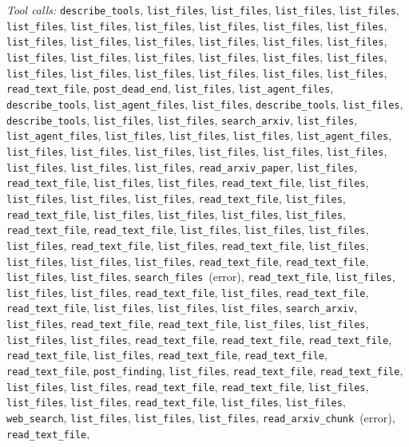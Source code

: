 \documentclass[11pt,a4paper]{article}
\begin{document}
\textit{Tool calls:} \texttt{describe\_tools}, \texttt{list\_files}, \texttt{list\_files}, \texttt{list\_files}, \texttt{list\_files}, \texttt{list\_files}, \texttt{list\_files}, \texttt{list\_files}, \texttt{list\_files}, \texttt{list\_files}, \texttt{list\_files}, \texttt{list\_files}, \texttt{list\_files}, \texttt{list\_files}, \texttt{list\_files}, \texttt{list\_files}, \texttt{list\_files}, \texttt{list\_files}, \texttt{list\_files}, \texttt{list\_files}, \texttt{list\_files}, \texttt{list\_files}, \texttt{list\_files}, \texttt{list\_files}, \texttt{list\_files}, \texttt{list\_files}, \texttt{list\_files}, \texttt{list\_files}, \texttt{list\_files}, \texttt{read\_text\_file}, \texttt{post\_dead\_end}, \texttt{list\_files}, \texttt{list\_agent\_files}, \texttt{describe\_tools}, \texttt{list\_agent\_files}, \texttt{list\_files}, \texttt{describe\_tools}, \texttt{list\_files}, \texttt{describe\_tools}, \texttt{list\_files}, \texttt{list\_files}, \texttt{search\_arxiv}, \texttt{list\_files}, \texttt{list\_agent\_files}, \texttt{list\_files}, \texttt{list\_files}, \texttt{list\_files}, \texttt{list\_agent\_files}, \texttt{list\_files}, \texttt{list\_files}, \texttt{list\_files}, \texttt{list\_files}, \texttt{list\_files}, \texttt{list\_files}, \texttt{list\_files}, \texttt{list\_files}, \texttt{list\_files}, \texttt{read\_arxiv\_paper}, \texttt{list\_files}, \texttt{read\_text\_file}, \texttt{list\_files}, \texttt{list\_files}, \texttt{read\_text\_file}, \texttt{list\_files}, \texttt{list\_files}, \texttt{list\_files}, \texttt{list\_files}, \texttt{read\_text\_file}, \texttt{list\_files}, \texttt{read\_text\_file}, \texttt{list\_files}, \texttt{list\_files}, \texttt{list\_files}, \texttt{list\_files}, \texttt{read\_text\_file}, \texttt{read\_text\_file}, \texttt{list\_files}, \texttt{list\_files}, \texttt{list\_files}, \texttt{list\_files}, \texttt{read\_text\_file}, \texttt{list\_files}, \texttt{read\_text\_file}, \texttt{list\_files}, \texttt{list\_files}, \texttt{list\_files}, \texttt{list\_files}, \texttt{read\_text\_file}, \texttt{read\_text\_file}, \texttt{list\_files}, \texttt{list\_files}, \texttt{search\_files}~(error), \texttt{read\_text\_file}, \texttt{list\_files}, \texttt{list\_files}, \texttt{list\_files}, \texttt{read\_text\_file}, \texttt{list\_files}, \texttt{read\_text\_file}, \texttt{read\_text\_file}, \texttt{list\_files}, \texttt{list\_files}, \texttt{list\_files}, \texttt{search\_arxiv}, \texttt{list\_files}, \texttt{read\_text\_file}, \texttt{read\_text\_file}, \texttt{list\_files}, \texttt{list\_files}, \texttt{list\_files}, \texttt{list\_files}, \texttt{read\_text\_file}, \texttt{read\_text\_file}, \texttt{read\_text\_file}, \texttt{read\_text\_file}, \texttt{list\_files}, \texttt{read\_text\_file}, \texttt{read\_text\_file}, \texttt{read\_text\_file}, \texttt{post\_finding}, \texttt{list\_files}, \texttt{read\_text\_file}, \texttt{read\_text\_file}, \texttt{list\_files}, \texttt{list\_files}, \texttt{read\_text\_file}, \texttt{read\_text\_file}, \texttt{list\_files}, \texttt{list\_files}, \texttt{list\_files}, \texttt{read\_text\_file}, \texttt{list\_files}, \texttt{list\_files}, \texttt{web\_search}, \texttt{list\_files}, \texttt{list\_files}, \texttt{list\_files}, \texttt{read\_arxiv\_chunk}~(error), \texttt{read\_text\_file}, 
\end{document}
